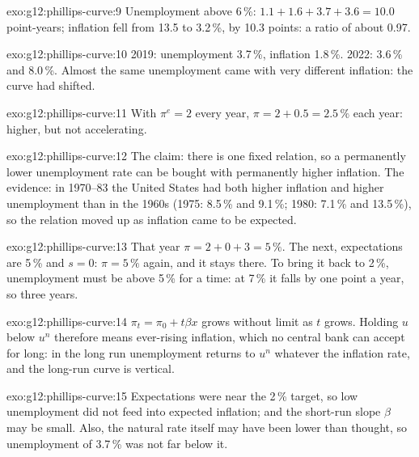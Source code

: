 \begin{solution}{exo:g12:phillips-curve:9}
Unemployment above 6\,\%: $1.1 + 1.6 + 3.7 + 3.6 = 10.0$ point-years; inflation fell from 13.5 to 3.2\,\%, by 10.3 points: a ratio of about 0.97.
\end{solution}

\begin{solution}{exo:g12:phillips-curve:10}
2019: unemployment 3.7\,\%, inflation 1.8\,\%. 2022: 3.6\,\% and 8.0\,\%. Almost the same unemployment came with very different inflation: the curve had shifted.
\end{solution}

\begin{solution}{exo:g12:phillips-curve:11}
With $\pi^e = 2$ every year, $\pi = 2 + 0.5 = 2.5\,\%$ each year: higher, but not accelerating.
\end{solution}

\begin{solution}{exo:g12:phillips-curve:12}
The claim: there is one fixed relation, so a permanently lower unemployment rate can be bought with permanently higher inflation. The evidence: in 1970--83 the United States had
both higher inflation and higher unemployment than in the 1960s (1975: 8.5\,\% and 9.1\,\%; 1980: 7.1\,\% and 13.5\,\%), so the relation moved up as inflation came to be expected.
\end{solution}

\begin{solution}{exo:g12:phillips-curve:13}
That year $\pi = 2 + 0 + 3 = 5\,\%$. The next, expectations are 5\,\% and $s = 0$: $\pi = 5\,\%$ again, and it stays there. To bring it back to 2\,\%, unemployment must be above 5\,\%
for a time: at 7\,\% it falls by one point a year, so three years.
\end{solution}

\begin{solution}{exo:g12:phillips-curve:14}
$\pi_t = \pi_0 + t\beta x$ grows without limit as $t$ grows. Holding $u$ below $u^n$ therefore means ever-rising inflation, which no central bank can accept for long: in the long
run unemployment returns to $u^n$ whatever the inflation rate, and the long-run curve is vertical.
\end{solution}

\begin{solution}{exo:g12:phillips-curve:15}
Expectations were  near the 2\,\% target, so low unemployment did not feed into expected inflation; and the short-run slope $\beta$ may be small. Also, the natural rate
itself may have been lower than thought, so unemployment of 3.7\,\% was not far below it.
\end{solution}

